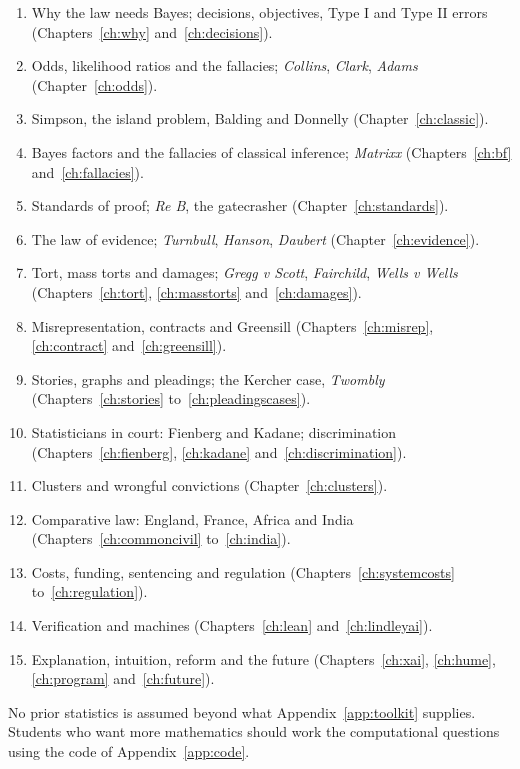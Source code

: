\begin{enumerate}[label=Week \arabic*.,leftmargin=4.6em]
\item Why the law needs Bayes; decisions, objectives, Type I and Type II errors (Chapters~\ref{ch:why} and~\ref{ch:decisions}).
\item Odds, likelihood ratios and the fallacies; \emph{Collins}, \emph{Clark}, \emph{Adams} (Chapter~\ref{ch:odds}).
\item Simpson, the island problem, Balding and Donnelly (Chapter~\ref{ch:classic}).
\item Bayes factors and the fallacies of classical inference; \emph{Matrixx} (Chapters~\ref{ch:bf} and~\ref{ch:fallacies}).
\item Standards of proof; \emph{Re B}, the gatecrasher (Chapter~\ref{ch:standards}).
\item The law of evidence; \emph{Turnbull}, \emph{Hanson}, \emph{Daubert} (Chapter~\ref{ch:evidence}).
\item Tort, mass torts and damages; \emph{Gregg v Scott}, \emph{Fairchild}, \emph{Wells v Wells} (Chapters~\ref{ch:tort}, \ref{ch:masstorts} and~\ref{ch:damages}).
\item Misrepresentation, contracts and Greensill (Chapters~\ref{ch:misrep}, \ref{ch:contract} and~\ref{ch:greensill}).
\item Stories, graphs and pleadings; the Kercher case, \emph{Twombly} (Chapters~\ref{ch:stories} to~\ref{ch:pleadingscases}).
\item Statisticians in court: Fienberg and Kadane; discrimination (Chapters~\ref{ch:fienberg}, \ref{ch:kadane} and~\ref{ch:discrimination}).
\item Clusters and wrongful convictions (Chapter~\ref{ch:clusters}).
\item Comparative law: England, France, Africa and India (Chapters~\ref{ch:commoncivil} to~\ref{ch:india}).
\item Costs, funding, sentencing and regulation (Chapters~\ref{ch:systemcosts} to~\ref{ch:regulation}).
\item Verification and machines (Chapters~\ref{ch:lean} and~\ref{ch:lindleyai}).
\item Explanation, intuition, reform and the future (Chapters~\ref{ch:xai}, \ref{ch:hume}, \ref{ch:program} and~\ref{ch:future}).
\end{enumerate}
No prior statistics is assumed beyond what Appendix~\ref{app:toolkit} supplies. Students who want more mathematics should work the computational questions using the code of Appendix~\ref{app:code}.

